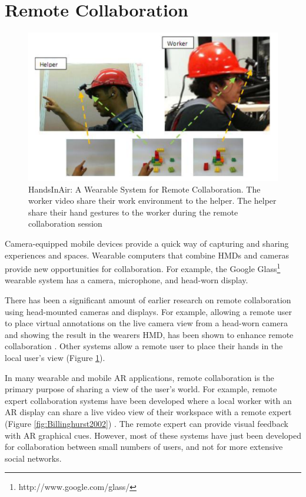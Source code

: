\section{Remote Collaboration}

\begin{figure}
    \centering
    \includegraphics[width=\linewidth]{images/Huang2013.PNG}
    \caption{HandsInAir: A Wearable System for Remote Collaboration. The worker video share their work environment to the helper. The helper share their hand gestures to the worker during the remote collaboration session \cite{Huang2013}}
    \label{fig:HandsInAir}
\end{figure}

Camera-equipped mobile devices provide a quick way of capturing and sharing experiences and spaces. Wearable computers that combine HMDs and cameras provide new opportunities for collaboration. For example, the Google Glass\footnote{http://www.google.com/glass/} wearable system has a camera, microphone, and head-worn display.

There has been a significant amount of earlier research on remote collaboration using head-mounted cameras and displays. For example, allowing a remote user to place virtual annotations on the live camera view from a head-worn camera and showing the result in the wearers HMD, has been shown to enhance remote collaboration \cite{Fussell2003}. Other systems allow a remote user to place their hands in the local user's view \cite{Huang2013} (Figure \ref{fig:HandsInAir}). 

In many wearable and mobile AR applications, remote collaboration is the primary purpose of sharing a view of the user's world. For example, remote expert collaboration systems have been developed where a local worker with an AR display can share a live video view of their workspace with a remote expert (Figure \ref{fig:Billinghurst2002}) \cite{Billinghurst2002}. The remote expert can provide visual feedback with AR graphical cues.  However, most of these systems have just been developed for collaboration between small numbers of users, and not for more extensive social networks. 

